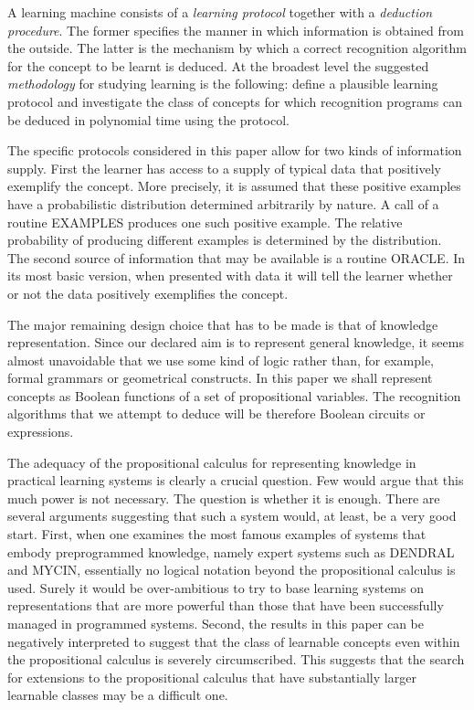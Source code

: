 A learning machine consists of a \emph{learning protocol} together with a \emph{deduction procedure}.  The
former specifies the manner in which information is
obtained from the outside.  The latter is the
mechanism by which a correct recognition algorithm
for the concept to be learnt is deduced.  At the
broadest level the suggested \emph{methodology} for
studying learning is the following:  define a
plausible learning protocol and investigate the
class of concepts for which recognition programs
can be deduced in polynomial time using the
protocol.

The specific protocols considered in this
paper allow for two kinds of information supply.
First the learner has access to a supply of typical data that positively exemplify the concept.
More precisely, it is assumed that these positive
examples have a probabilistic distribution determined arbitrarily by nature.  A call of a routine
EXAMPLES produces one such positive example.  The
relative probability of producing different examples is determined by the distribution.  The
second source of information that may be available is a routine ORACLE.  In its most basic
version, when presented with data it will tell the
learner whether or not the data positively exemplifies the concept.

The major remaining design choice that has to
be made is that of knowledge representation.
Since our declared aim is to represent general
knowledge, it seems almost unavoidable that we use
some kind of logic rather than, for example,
formal grammars or geometrical constructs.  In
this paper we shall represent concepts as Boolean
functions of a set of propositional variables.
The recognition algorithms that we attempt to
deduce will be therefore Boolean circuits or
expressions.

The adequacy of the propositional calculus
for representing knowledge in practical learning
systems is clearly a crucial question.  Few would
argue that this much power is not necessary.  The
question is whether it is enough.  There are
several arguments suggesting that such a system
would, at least, be a very good start.  First,
when one examines the most famous examples of
systems that embody preprogrammed knowledge,
namely expert systems such as DENDRAL and MYCIN,
essentially no logical notation beyond the propositional calculus is used.  Surely it would be
over-ambitious to try to base learning systems
on representations that are more powerful than
those that have been successfully managed in programmed systems.  Second, the results in this
paper can be negatively interpreted to suggest
that the class of learnable concepts even within
the propositional calculus is severely circumscribed.  This suggests that the search for extensions to the propositional calculus that have
substantially larger learnable classes may be a
difficult one.

